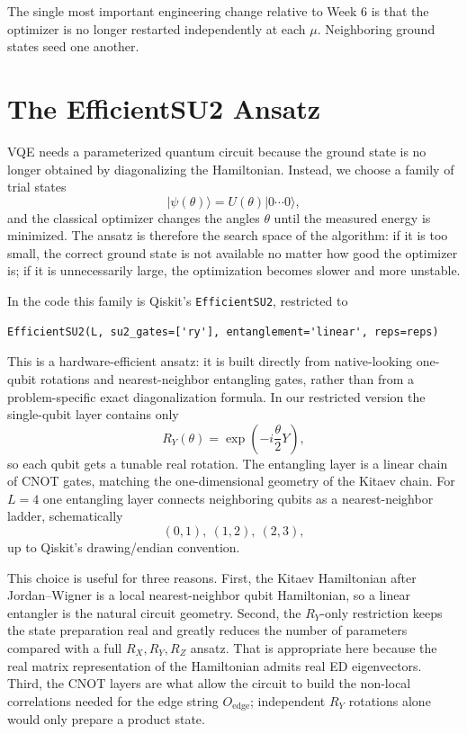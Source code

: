\documentclass[11pt]{article}
\newcommand{\ket}[1]{|#1\rangle}
\begin{document}
The single most important engineering change relative to Week 6 is that the optimizer is no longer restarted independently at each $\mu$. Neighboring ground states seed one another.

\section{The EfficientSU2 Ansatz}

VQE needs a parameterized quantum circuit because the ground state is no longer obtained by diagonalizing the Hamiltonian. Instead, we choose a family of trial states
\begin{equation}
  \ket{\psi(\theta)} = U(\theta)\ket{0\cdots 0},
\end{equation}
and the classical optimizer changes the angles $\theta$ until the measured energy is minimized. The ansatz is therefore the search space of the algorithm: if it is too small, the correct ground state is not available no matter how good the optimizer is; if it is unnecessarily large, the optimization becomes slower and more unstable.

In the code this family is Qiskit's \texttt{EfficientSU2}, restricted to
\begin{verbatim}
EfficientSU2(L, su2_gates=['ry'], entanglement='linear', reps=reps)
\end{verbatim}
This is a hardware-efficient ansatz: it is built directly from native-looking one-qubit rotations and nearest-neighbor entangling gates, rather than from a problem-specific exact diagonalization formula. In our restricted version the single-qubit layer contains only
\begin{equation}
  R_Y(\theta)=\exp\left(-i\frac{\theta}{2}Y\right),
\end{equation}
so each qubit gets a tunable real rotation. The entangling layer is a linear chain of CNOT gates, matching the one-dimensional geometry of the Kitaev chain. For $L=4$ one entangling layer connects neighboring qubits as a nearest-neighbor ladder, schematically
\begin{equation}
  (0,1),\ (1,2),\ (2,3),
\end{equation}
up to Qiskit's drawing/endian convention.

This choice is useful for three reasons. First, the Kitaev Hamiltonian after Jordan--Wigner is a local nearest-neighbor qubit Hamiltonian, so a linear entangler is the natural circuit geometry. Second, the $R_Y$-only restriction keeps the state preparation real and greatly reduces the number of parameters compared with a full $R_X,R_Y,R_Z$ ansatz. That is appropriate here because the real matrix representation of the Hamiltonian admits real ED eigenvectors. Third, the CNOT layers are what allow the circuit to build the non-local correlations needed for the edge string $O_{\mathrm{edge}}$; independent $R_Y$ rotations alone would only prepare a product state.
\end{document}
